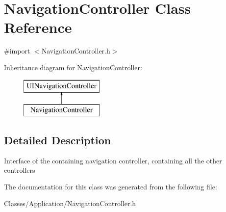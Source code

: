 \hypertarget{interface_navigation_controller}{}\section{Navigation\+Controller Class Reference}
\label{interface_navigation_controller}


{\ttfamily \#import $<$Navigation\+Controller.\+h$>$}

Inheritance diagram for Navigation\+Controller\+:\begin{figure}[H]
\begin{center}
\leavevmode
\includegraphics[height=2.000000cm]{interface_navigation_controller}
\end{center}
\end{figure}


\subsection{Detailed Description}
Interface of the containing navigation controller, containing all the other controllers 

The documentation for this class was generated from the following file\+:\begin{DoxyCompactItemize}
\item 
Classes/\+Application/Navigation\+Controller.\+h\end{DoxyCompactItemize}
